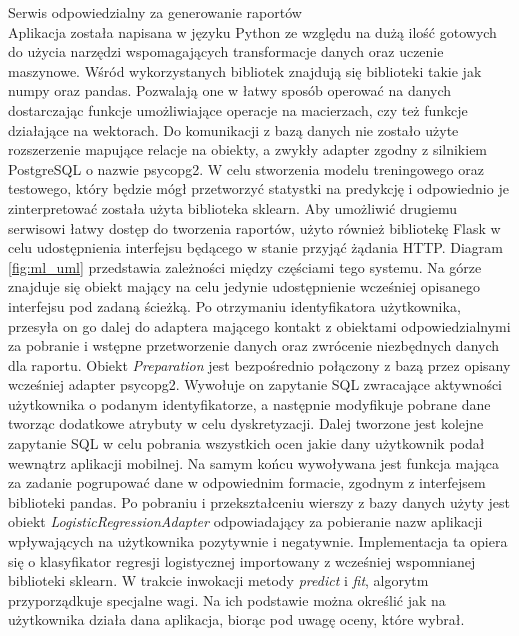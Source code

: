 \documentclass[a4paper,twoside,12pt]{book}
\begin{document}
\begin{description}
\item Serwis odpowiedzialny za generowanie raportów \hfill \\
Aplikacja została napisana w języku Python ze względu na dużą ilość gotowych do użycia narzędzi wspomagających transformacje danych oraz uczenie maszynowe. Wśród wykorzystanych bibliotek znajdują się biblioteki takie jak numpy oraz pandas. Pozwalają one w łatwy sposób operować na danych dostarczając funkcje umożliwiające operacje na macierzach, czy też funkcje działające na wektorach.
Do komunikacji z bazą danych nie zostało użyte rozszerzenie mapujące relacje na obiekty, a zwykły adapter zgodny z silnikiem PostgreSQL o nazwie psycopg2. W celu stworzenia modelu treningowego oraz testowego, który będzie mógł przetworzyć statystki na predykcję i odpowiednio je zinterpretować została użyta biblioteka sklearn. Aby umożliwić drugiemu serwisowi łatwy dostęp do tworzenia raportów, użyto również bibliotekę Flask w celu udostępnienia interfejsu będącego w stanie przyjąć żądania HTTP. Diagram \ref{fig:ml_uml} przedstawia zależności między częściami tego systemu. Na górze znajduje się obiekt mający na celu jedynie udostępnienie wcześniej opisanego interfejsu pod zadaną ścieżką. Po otrzymaniu identyfikatora użytkownika, przesyła on go dalej do adaptera mającego kontakt z obiektami odpowiedzialnymi za pobranie i wstępne przetworzenie danych oraz zwrócenie niezbędnych danych dla raportu. Obiekt \textit{Preparation} jest bezpośrednio połączony z bazą przez opisany wcześniej adapter psycopg2. Wywołuje on zapytanie SQL zwracające aktywności użytkownika o podanym identyfikatorze, a następnie modyfikuje pobrane dane tworząc dodatkowe atrybuty w celu dyskretyzacji. Dalej tworzone jest kolejne zapytanie SQL w celu pobrania wszystkich ocen jakie dany użytkownik podał wewnątrz aplikacji mobilnej. Na samym końcu wywoływana jest funkcja mająca za zadanie pogrupować dane w odpowiednim formacie, zgodnym z interfejsem biblioteki pandas. Po pobraniu i przekształceniu wierszy z bazy danych użyty jest obiekt \textit{LogisticRegressionAdapter} odpowiadający za pobieranie nazw aplikacji wpływających na użytkownika pozytywnie i negatywnie. Implementacja ta opiera się o klasyfikator regresji logistycznej importowany z wcześniej wspomnianej biblioteki sklearn\cite{logistic_regression}. W trakcie inwokacji metody \textit{predict} i \textit{fit}, algorytm przyporządkuje specjalne wagi. Na ich podstawie można określić jak na użytkownika działa dana aplikacja, biorąc pod uwagę oceny, które wybrał. 



\end{description}
\end{document}
